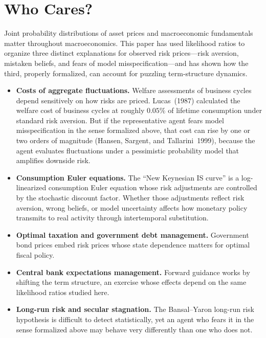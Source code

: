 \documentclass[12pt]{article}
\theoremstyle{definition}
\begin{document}
\section{Who Cares?}
\label{sec:conclusion}

Joint probability distributions of asset prices and macroeconomic fundamentals matter throughout macroeconomics.
This paper has used likelihood ratios to organize three distinct explanations for observed risk prices---risk aversion, mistaken beliefs, and fears of model misspecification---and has shown how the third, properly formalized, can account for puzzling term-structure dynamics.
\begin{itemize}
\item \textbf{Costs of aggregate fluctuations.}  Welfare assessments of
      business cycles depend sensitively on how risks are priced.
      Lucas~(1987) calculated the welfare cost of business cycles at
      roughly $0.05\%$ of lifetime consumption under standard risk
      aversion.  But if the representative agent fears model
      misspecification in the sense formalized above, that cost can rise
      by one or two orders of magnitude (Hansen, Sargent, and
      Tallarini~1999), because the agent evaluates fluctuations under a
      pessimistic probability model that amplifies downside risk.
\item \textbf{Consumption Euler equations.}  The ``New Keynesian IS
      curve'' is a log-linearized consumption Euler equation whose risk
      adjustments are controlled by the stochastic discount factor.
      Whether those adjustments reflect risk aversion, wrong beliefs, or model uncertainty affects how monetary policy transmits to real activity through intertemporal substitution.
\item \textbf{Optimal taxation and government debt management.}
       Government bond prices embed risk prices whose state dependence
       matters for optimal fiscal policy.
\item \textbf{Central bank expectations management.}  Forward guidance
      works by shifting the term structure, an exercise whose effects
      depend on the same likelihood ratios studied here.
\item \textbf{Long-run risk and secular stagnation.}  The Bansal--Yaron
      long-run risk hypothesis is difficult to detect statistically, yet
      an agent who fears it in the sense formalized above may behave
      very differently than one who does not.
\end{itemize}
\end{document}

